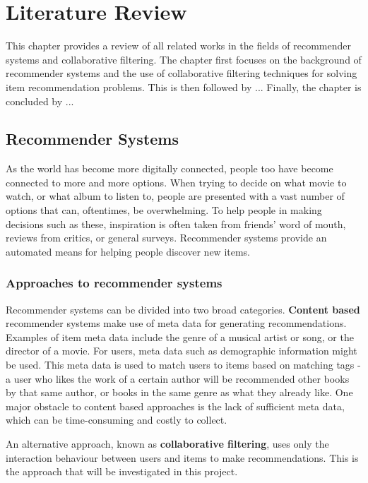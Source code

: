 \chapter{Literature Review}
\label{lit_review} %
This chapter provides a review of all related works in the fields of recommender systems and collaborative filtering. The chapter first focuses on the background of recommender systems and the use of collaborative filtering techniques for solving item recommendation problems. This is then followed by ... Finally, the chapter is concluded by ...

\section{Recommender Systems}
As the world has become more digitally connected, people too have become connected to more and more options. When trying to decide on what movie to watch, or what album to listen to, people are presented with a vast number of options that can, oftentimes, be overwhelming. To help people in making decisions such as these, inspiration is often taken from friends' word of mouth, reviews from critics, or general surveys. Recommender systems provide an automated means for helping people discover new items. \parencite{rs_1.1_Resnick}

\subsection{Approaches to recommender systems}
Recommender systems can be divided into two broad categories. \textbf{Content based} recommender systems make use of meta data for generating recommendations. Examples of item meta data include the genre of a musical artist or song, or the director of a movie. For users, meta data such as demographic information might be used. This meta data is used to match users to items based on matching tags - a user who likes the work of a certain author will be recommended other books by that same author, or books in the same genre as what they already like. One major obstacle to content based approaches is the lack of sufficient meta data, which can be time-consuming and costly to collect. \parencite{cf_1.6_implicit}

An alternative approach, known as \textbf{collaborative filtering}, uses only the interaction behaviour between users and items to make recommendations. This is the approach that will be investigated in this project.


